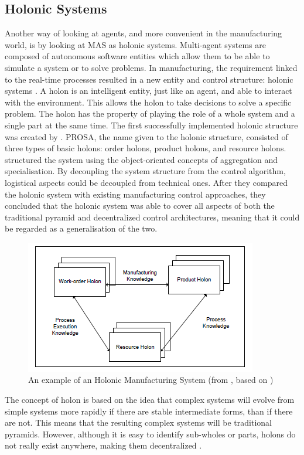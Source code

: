 \subsection{Holonic Systems}
Another way of looking at agents, and more convenient in the manufacturing world, is by looking at MAS as holonic systems. Multi-agent systems are composed of autonomous software entities which allow them to be able to simulate a system or to solve problems. In manufacturing, the requirement linked to the real-time processes resulted in a new entity and control structure: holonic systems \citep{giret2005multi}. A holon is an intelligent entity, just like an agent, and able to interact with the environment. This allows the holon to take decisions to solve a specific problem. The holon has the property of playing the role of a whole system and a single part at the same time. The first successfully implemented holonic structure was created by \citet{van1998reference}. PROSA, the name given to the holonic structure, consisted of three types of basic holons: order holons, product holons, and resource holons. \citet{van1998reference} structured the system using the object-oriented concepts of aggregation and specialisation. By decoupling the system structure from the control algorithm, logistical aspects could be decoupled from technical ones. After they compared the holonic system with existing manufacturing control approaches, they concluded that the holonic system was able to cover all aspects of both the traditional pyramid and decentralized control architectures, meaning that it could be regarded as a generalisation of the two. 
\begin{figure}[h]
\centering
\includegraphics[width=0.7\linewidth]{img/holonic_manufacturing}
\caption{An example of an Holonic Manufacturing System (from \citet{giret2005multi}, based on \citet{van1998reference})}
\label{fig:holonicmanufacturing}
\end{figure}

The concept of holon is based on the idea that complex systems will evolve from simple systems more rapidly if there are stable intermediate forms, than if there are not. This means that the resulting complex systems will be traditional pyramids. However, although it is easy to identify sub-wholes or parts, holons do not really exist anywhere, making them decentralized \citep{van1998reference}.

